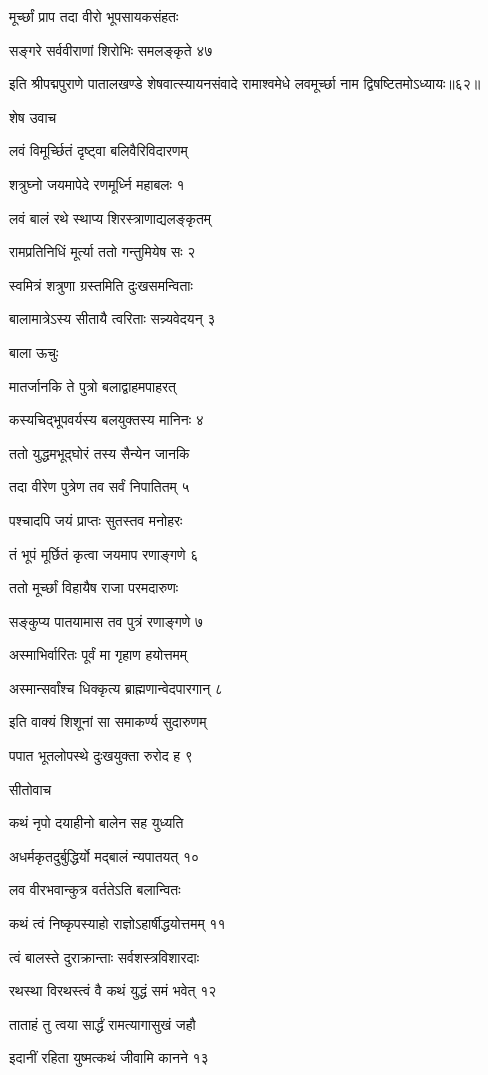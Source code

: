 मूर्च्छां प्राप तदा वीरो भूपसायकसंहतः

सङ्गरे सर्ववीराणां शिरोभिः समलङ्कृते ४७

इति श्रीपद्मपुराणे पातालखण्डे शेषवात्स्यायनसंवादे रामाश्वमेधे लवमूर्च्छा नाम द्विषष्टितमोऽध्यायः॥६२॥


शेष उवाच

लवं विमूर्च्छितं दृष्ट्वा बलिवैरिविदारणम्

शत्रुघ्नो जयमापेदे रणमूर्ध्नि महाबलः १

लवं बालं रथे स्थाप्य शिरस्त्राणाद्यलङ्कृतम्

रामप्रतिनिधिं मूर्त्या ततो गन्तुमियेष सः २

स्वमित्रं शत्रुणा ग्रस्तमिति दुःखसमन्विताः

बालामात्रेऽस्य सीतायै त्वरिताः सन्न्यवेदयन् ३

बाला ऊचुः

मातर्जानकि ते पुत्रो बलाद्वाहमपाहरत्

कस्यचिद्भूपवर्यस्य बलयुक्तस्य मानिनः ४

ततो युद्धमभूद्घोरं तस्य सैन्येन जानकि

तदा वीरेण पुत्रेण तव सर्वं निपातितम् ५

पश्चादपि जयं प्राप्तः सुतस्तव मनोहरः

तं भूपं मूर्छितं कृत्वा जयमाप रणाङ्गणे ६

ततो मूर्च्छां विहायैष राजा परमदारुणः

सङ्कुप्य पातयामास तव पुत्रं रणाङ्गणे ७

अस्माभिर्वारितः पूर्वं मा गृहाण हयोत्तमम्

अस्मान्सर्वांश्च धिक्कृत्य ब्राह्मणान्वेदपारगान् ८

इति वाक्यं शिशूनां सा समाकर्ण्य सुदारुणम्

पपात भूतलोपस्थे दुःखयुक्ता रुरोद ह ९

सीतोवाच

कथं नृपो दयाहीनो बालेन सह युध्यति

अधर्मकृतदुर्बुद्धिर्यो मद्बालं न्यपातयत् १०

लव वीरभवान्कुत्र वर्ततेऽति बलान्वितः

कथं त्वं निष्कृपस्याहो राज्ञोऽहार्षीद्धयोत्तमम् ११

त्वं बालस्ते दुराक्रान्ताः सर्वशस्त्रविशारदाः

रथस्था विरथस्त्वं वै कथं युद्धं समं भवेत् १२

ताताहं तु त्वया सार्द्धं रामत्यागासुखं जहौ

इदानीं रहिता युष्मत्कथं जीवामि कानने १३


